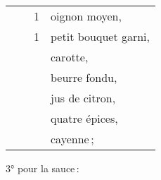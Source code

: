 \begin{longtable}{rrrp{16em}}
        &         &  1 & oignon moyen,                                                                    \\
        &         &  1 & petit bouquet garni,                                                             \\
        &         &    & carotte,                                                                         \\
        &         &    & beurre fondu,                                                                    \\
        &         &    & jus de citron,                                                                   \\
        &         &    & quatre épices,                                                                   \\
        &         &    & cayenne ;                                                                        \\
\end{longtable}
\normalsize

\medskip

3° pour la sauce :

